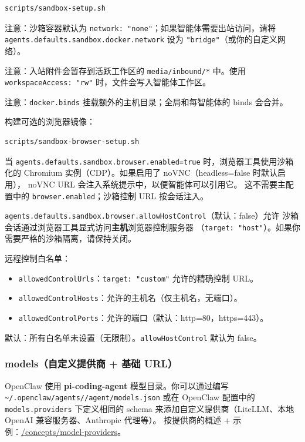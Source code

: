 \begin{lstlisting}[language=bash]
scripts/sandbox-setup.sh
\end{lstlisting}


注意：沙箱容器默认为 \texttt{network: "none"}；如果智能体需要出站访问，请将 \texttt{agents.defaults.sandbox.docker.network} 设为 \texttt{"bridge"}（或你的自定义网络）。

注意：入站附件会暂存到活跃工作区的 \texttt{media/inbound/*} 中。使用 \texttt{workspaceAccess: "rw"} 时，文件会写入智能体工作区。

注意：\texttt{docker.binds} 挂载额外的主机目录；全局和每智能体的 binds 会合并。

构建可选的浏览器镜像：

\begin{lstlisting}[language=bash]
scripts/sandbox-browser-setup.sh
\end{lstlisting}


当 \texttt{agents.defaults.sandbox.browser.enabled=true} 时，浏览器工具使用沙箱化的
Chromium 实例（CDP）。如果启用了 noVNC（headless=false 时默认启用），
noVNC URL 会注入系统提示中，以便智能体可以引用它。
这不需要主配置中的 \texttt{browser.enabled}；沙箱控制 URL 按会话注入。

\texttt{agents.defaults.sandbox.browser.allowHostControl}（默认：false）允许
沙箱会话通过浏览器工具显式访问\textbf{主机}浏览器控制服务器
（\texttt{target: "host"}）。如果你需要严格的沙箱隔离，请保持关闭。

远程控制白名单：

\begin{itemize}
  \item \texttt{allowedControlUrls}：\texttt{target: "custom"} 允许的精确控制 URL。
  \item \texttt{allowedControlHosts}：允许的主机名（仅主机名，无端口）。
  \item \texttt{allowedControlPorts}：允许的端口（默认：http=80，https=443）。
\end{itemize}

默认：所有白名单未设置（无限制）。\texttt{allowHostControl} 默认为 false。

\subsubsection{models（自定义提供商 + 基础 URL）}


OpenClaw 使用 \textbf{pi-coding-agent} 模型目录。你可以通过编写
\texttt{\textasciitilde{}/.openclaw/agents//agent/models.json} 或在 OpenClaw 配置中的 \texttt{models.providers} 下定义相同的 schema 来添加自定义提供商（LiteLLM、本地 OpenAI 兼容服务器、Anthropic 代理等）。
按提供商的概述 + 示例：\href{/concepts/model-providers}{/concepts/model-providers}。

